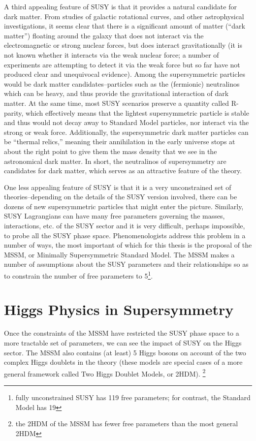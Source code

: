 A third appealing feature of SUSY is that it provides a natural candidate for dark 
matter.  From studies of galactic rotational curves, and other astrophysical investigations, it 
seems clear that there is a significant amount of matter (``dark matter'') floating 
around the galaxy that does not interact via the electromagnetic or strong nuclear forces, 
but does interact gravitationally (it is not known whether it interacts via the weak 
nuclear force; a number of experiments are attempting to detect it via the weak 
force but so far have not produced clear and unequivocal evidence).  Among the supersymmetric 
particles would be dark matter candidates--particles such as the (fermionic) neutralinos 
which can be heavy, and thus provide the gravitational interaction of dark matter.  
At the same time, most SUSY scenarios preserve a quantity called R-parity, 
which effectively means that the lightest supersymmetric particle is stable and thus 
would not decay away to Standard Model particles, nor interact via the strong or 
weak force.  Additionally, the supersymmetric dark matter particles can be ``thermal
relics,'' meaning their annihilation in the early universe stops at about the right
point to give them the mass density that we see in the astronomical dark matter.
In short, the neutralinos of supersymmetry are candidates for dark matter, 
which serves as an attractive feature of the theory. 


One less appealing feature of SUSY is that it is a very unconstrained set 
of theories--depending on the details of the SUSY version involved, there can 
be dozens of new supersymmetric particles that might enter 
the picture.  Similarly, SUSY Lagrangians can have many free parameters governing the masses, 
interactions, etc. of the SUSY sector and it is very difficult, perhaps 
impossible, to probe all the SUSY phase space.  Phenomenologists address this problem in 
a number of ways, the most important of which for this thesis is the 
proposal of the MSSM, or Minimally Supersymmetric Standard Model.  The MSSM makes a 
number of assumptions about the SUSY parameters and their relationships so as to constrain the 
number of free parameters to 5\footnote{fully unconstrained SUSY has 119 free parameters; for
contrast, the Standard Model has 19}.  

\section{Higgs Physics in Supersymmetry}
\label{sec:SUSY_Higgs}
Once the constraints of the MSSM have restricted the SUSY phase space to a more 
tractable set of parameters, we can see the impact of SUSY on the Higgs sector.  
The MSSM also contains (at least) 5 Higgs bosons on account of the 
two complex Higgs doublets in the theory (these models are 
special cases of a more general framework called Two Higgs Doublet Models, or 2HDM).
\footnote{the 2HDM of the MSSM has fewer free parameters than the most general 2HDM}  

